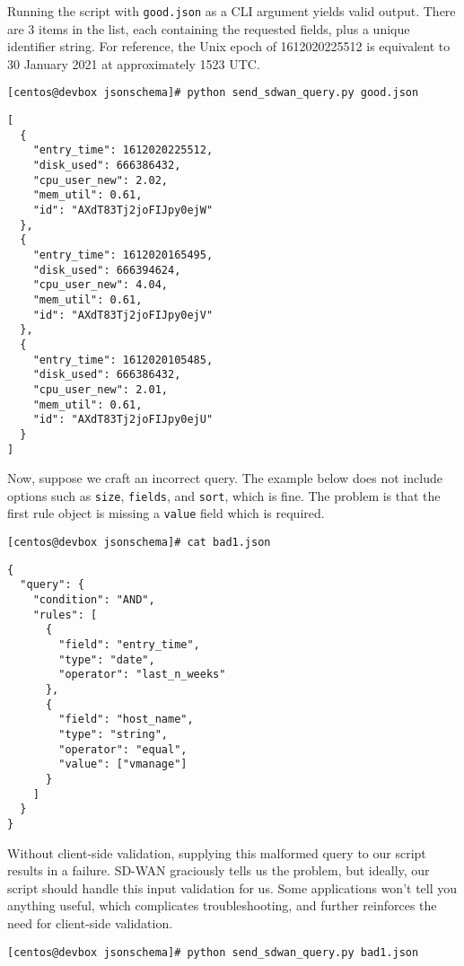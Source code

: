 Running the script with \verb|good.json| as a CLI argument yields
valid output. There are 3 items in the list, each containing the
requested fields, plus a unique identifier string. For reference,
the Unix epoch of 1612020225512 is equivalent to 30 January 2021
at approximately 1523 UTC\@.

\begin{verbatim}
[centos@devbox jsonschema]# python send_sdwan_query.py good.json
\end{verbatim}

\begin{verbatim}
[
  {
    "entry_time": 1612020225512,
    "disk_used": 666386432,
    "cpu_user_new": 2.02,
    "mem_util": 0.61,
    "id": "AXdT83Tj2joFIJpy0ejW"
  },
  {
    "entry_time": 1612020165495,
    "disk_used": 666394624,
    "cpu_user_new": 4.04,
    "mem_util": 0.61,
    "id": "AXdT83Tj2joFIJpy0ejV"
  },
  {
    "entry_time": 1612020105485,
    "disk_used": 666386432,
    "cpu_user_new": 2.01,
    "mem_util": 0.61,
    "id": "AXdT83Tj2joFIJpy0ejU"
  }
]
\end{verbatim}

Now, suppose we craft an incorrect query. The example below does not include
options such as \verb|size|, \verb|fields|, and \verb|sort|, which is fine.
The problem is that the first rule object is missing a \verb|value| field
which is required.

\begin{verbatim}
[centos@devbox jsonschema]# cat bad1.json
\end{verbatim}

\begin{verbatim}
{
  "query": {
    "condition": "AND",
    "rules": [
      {
        "field": "entry_time",
        "type": "date",
        "operator": "last_n_weeks"
      },
      {
        "field": "host_name",
        "type": "string",
        "operator": "equal",
        "value": ["vmanage"]
      }
    ]
  }
}
\end{verbatim}

Without client-side validation, supplying this malformed query to our
script results in a failure. SD-WAN graciously tells us the problem, but
ideally, our script should handle this input validation for us. Some
applications won't tell you anything useful, which complicates troubleshooting,
and further reinforces the need for client-side validation.

\begin{verbatim}
[centos@devbox jsonschema]# python send_sdwan_query.py bad1.json
\end{verbatim}

